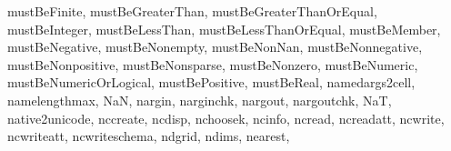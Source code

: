 {{        mustBeFinite,%
        mustBeGreaterThan,%
        mustBeGreaterThanOrEqual,%
        mustBeInteger,%
        mustBeLessThan,%
        mustBeLessThanOrEqual,%
        mustBeMember,%
        mustBeNegative,%
        mustBeNonempty,%
        mustBeNonNan,%
        mustBeNonnegative,%
        mustBeNonpositive,%
        mustBeNonsparse,%
        mustBeNonzero,%
        mustBeNumeric,%
        mustBeNumericOrLogical,%
        mustBePositive,%
        mustBeReal,%
        namedargs2cell,%
        namelengthmax,%
        NaN,%
        nargin,%
        narginchk,%
        nargout,%
        nargoutchk,%
        NaT,%
        native2unicode,%
        nccreate,%
        ncdisp,%
        nchoosek,%
        ncinfo,%
        ncread,%
        ncreadatt,%
        ncwrite,%
        ncwriteatt,%
        ncwriteschema,%
        ndgrid,%
        ndims,%
        nearest,%
}}

